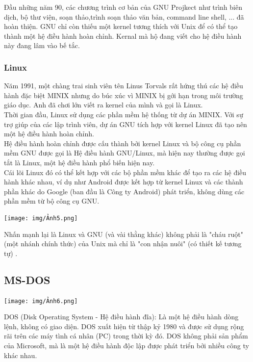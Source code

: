 \documentclass[12pt,a4paper]{article}
\begin{document}
Đầu những năm 90, các chương trình cơ bản của GNU Projkect như trình biên dịch, bộ thư viện, soạn thảo,trình soạn thảo văn bản, command line shell, ... đã hoàn thiện. GNU chỉ còn thiếu một kernel tương thích với Unix để có thể tạo thành một hệ điều hành hoàn chỉnh. Kernal mà hộ đang viết cho hệ điều hành này đang lâm vào bế tắc.\\
\subsubsection{Linux}
Năm 1991, một chàng trai sinh viên tên Linus Torvals rất hứng thú các hệ điều hành đặc biệt MINIX nhưng do búc xúc vì MINIX bị gới hạn trong môi trường giáo dục. Anh đã chơi lớn viết ra kernel của mình và gọi là Linux.\\

Thời gian đầu, Linux sử dụng các phần mềm hệ thống từ dự án MINIX. Với sự trợ giúp của các lập trình viên, dự án GNU tích hợp với kernel Linux đã tạo nên một hệ điều hành hoàn chỉnh. \\

Hệ điều hành hoàn chỉnh được cấu thành bởi kernel Linux và bộ công cụ phần mềm GNU được gọi là Hệ điều hành GNU/Linux, mà hiện nay thường được gọi tắt là Linux, một hệ điều hành phổ biến hiện nay.\\

Cái lõi Linux đó có thể kết hợp với các bộ phần mềm khác để tạo ra các hệ điều hành khác nhau, ví dụ như Android được kết hợp từ kernel Linux và các thành phần khác do Google (ban đầu là Công ty Android) phát triển, không dùng các phần mềm từ bộ công cụ GNU.
\begin{center}
	\texttt{[image: img/Ảnh5.png]}
\end{center}
Nhấn  mạnh lại là Linux và GNU (và vài thằng khác) không phải là "cháu ruột" (một nhánh chính thức) của Unix mà chỉ là "con nhận nuôi" (có thiết kế tương tự) .
\subsection{MS-DOS}
\begin{center}
	\texttt{[image: img/Ảnh6.png]}
\end{center}
DOS (Disk Operating System - Hệ điều hành đĩa): Là một hệ điều hành dòng lệnh, không có giao diện. DOS xuất hiện từ thập kỷ 1980 và được sử dụng rộng rãi trên các máy tình cá nhân (PC) trong thời kỳ đó. DOS không phải sản phẩm của Microsoft, mà là một hệ điều hành độc lập được phát triển bởi nhiều công ty khác nhau. \\
\end{document}

